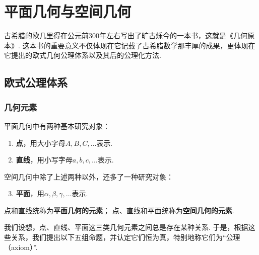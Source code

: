 \chapter{平面几何与空间几何}
古希腊的欧几里得在公元前300年左右写出了旷古烁今的一本书，这就是《几何原本》.
这本书的重要意义不仅体现在它记载了古希腊数学那丰厚的成果，更体现在它提出的欧式几何公理体系以及其后的公理化方法.

\section{欧式公理体系}
\subsection{几何元素}
\begin{definition}
平面几何中有两种基本研究对象：\begin{enumerate}
\item \textbf{点}，用大小字母\(A,B,C,\dotsc\)表示.
\item \textbf{直线}，用小写字母\(a,b,c,\dotsc\)表示.
\end{enumerate}
空间几何中除了上述两种以外，还多了一种研究对象：\begin{enumerate}
\setcounter{enumi}{2}
\item \textbf{平面}，用\(\alpha,\beta,\gamma,\dotsc\)表示.
\end{enumerate}
点和直线统称为\textbf{平面几何的元素}；
点、直线和平面统称为\textbf{空间几何的元素}.
\end{definition}

我们设想，点、直线、平面这三类几何元素之间总是存在某种关系.
于是，根据这些关系，我们提出以下五组命题，并认定它们恒为真，特别地称它们为“公理（axiom）”.

